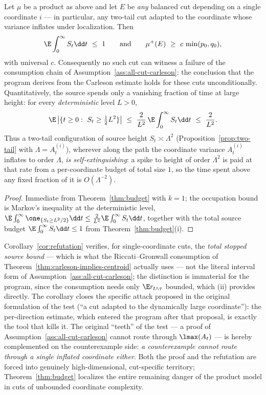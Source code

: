 \documentclass[../../main.tex]{subfiles}
\begin{document}
\begin{corollary}
\label{cor:refutation}
Let $\mu$ be a product as above and let $E$ be \emph{any} balanced cut depending on a single
coordinate $i$ --- in particular, any two-tail cut adapted to the coordinate whose variance
inflates under localization. Then
\[
  \E\int_0^\infty S_t\dd t\ \le\ 1
  \qquad\text{and}\qquad
  \mu^+(E)\ \ge\ c\,\min(p_0,q_0),
\]
with universal $c$. Consequently no such cut can witness a failure of the consumption chain of
Assumption~\ref{ass:all-cut-carleson}: the conclusion that the program derives from the Carleson estimate holds for
these cuts unconditionally. Quantitatively, the source spends only a vanishing fraction of time
at large height: for every \emph{deterministic} level $L>0$,
\[
  \E\,\bigl|\{t\ge0:\ S_t\ge\tfrac12L^2\}\bigr|
  \ \le\ \frac2{L^2}\,\E\int_0^\infty S_t\dd t\ \le\ \frac2{L^2}.
\]
Thus a two-tail configuration of source height $S_t\asymp\Lambda^2$
(Proposition~\ref{prop:two-tail} with $\Lambda=A_t^{(i)}$), wherever along the path the
coordinate variance $A_t^{(i)}$ inflates to order $\Lambda$, \emph{is self-extinguishing}: a
spike to height of order $\Lambda^2$ is paid at that rate from a per-coordinate budget of total
size $1$, so the time spent above any fixed fraction of it is $O(\Lambda^{-2})$.
\end{corollary}

\begin{proof}
Immediate from Theorem~\ref{thm:budget} with $k=1$; the occupation bound is Markov's inequality
at the deterministic level,
$\E\int_0^\infty\one_{\{S_t\ge L^2/2\}}\dd t\le\frac2{L^2}\E\int_0^\infty S_t\dd t$, together with
the total source budget $\E\int_0^\infty S_t\dd t\le1$ from Theorem~\ref{thm:budget}(i).
\end{proof}

\begin{remark}
\label{rem:refutation-scope}
Corollary~\ref{cor:refutation} verifies, for single-coordinate cuts, the \emph{total stopped
source bound} --- which is what the Riccati--Gronwall consumption of Theorem~\ref{thm:carleson-implies-centroid}
actually uses --- not the literal interval form of Assumption~\ref{ass:all-cut-carleson}; the distinction is
immaterial for the program, since the consumption needs only
$\E r_{t\wedge\tau}$ bounded, which (ii) provides directly. The corollary closes the specific
attack proposed in the original formulation of the test (``a cut adapted to the dynamically
large coordinate''): the per-direction estimate, which entered the program after that
proposal, is exactly the tool that kills it. The original ``teeth'' of the test --- a proof of
Assumption~\ref{ass:all-cut-carleson} cannot route through $\lmax(A_t)$ --- is hereby complemented on the
counterexample side: \emph{a counterexample cannot route through a single inflated coordinate
either}. Both the proof and the refutation are forced into genuinely high-dimensional,
cut-specific territory; Theorem~\ref{thm:budget} localizes the entire remaining danger of the
product model in cuts of unbounded coordinate complexity.
\end{remark}
\end{document}
